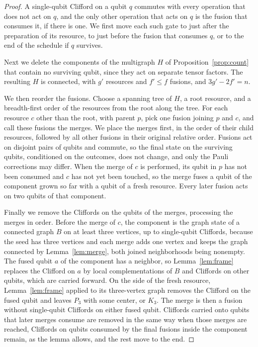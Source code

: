 \documentclass[aps,pra,onecolumn,superscriptaddress,nofootinbib,longbibliography]{revtex4-2}
\theoremstyle{plain}
\theoremstyle{remark}
\begin{document}
\begin{proof}
A single-qubit Clifford on a qubit $q$ commutes with every operation that does not act on $q$, and the only
other operation that acts on $q$ is the fusion that consumes it, if there is one. We first move each such
gate to just after the preparation of its resource, to just before the fusion that consumes $q$, or to the
end of the schedule if $q$ survives.

Next we delete the components of the multigraph $H$ of Proposition~\ref{prop:count} that contain no
surviving qubit, since they act on separate tensor factors. The resulting $H$ is connected, with $g'$
resources and $f'\le f$ fusions, and $3g'-2f'=n$.

We then reorder the fusions. Choose a spanning tree of $H$, a root resource, and a breadth-first order of
the resources from the root along the tree. For each resource $c$ other than the root, with parent $p$,
pick one fusion joining $p$ and $c$, and call these fusions the merges. We place the merges first, in the
order of their child resources, followed by all other fusions in their original relative order. Fusions act
on disjoint pairs of qubits and commute, so the final state on the surviving qubits, conditioned on the
outcomes, does not change, and only the Pauli corrections may differ. When the merge of $c$ is performed,
its qubit in $p$ has not been consumed and $c$ has not yet been touched, so the merge fuses a qubit of the
component grown so far with a qubit of a fresh resource. Every later fusion acts on two qubits of that
component.

Finally we remove the Cliffords on the qubits of the merges, processing the merges in order. Before the merge
of $c$, the component is the graph state of a connected graph $B$ on at least three vertices, up to
single-qubit Cliffords, because the seed has three vertices and each merge adds one vertex and keeps the graph
connected by Lemma~\ref{lem:merge}, both joined neighborhoods being nonempty. The fused qubit $a$ of the
component has a neighbor, so Lemma~\ref{lem:frame} replaces the Clifford on $a$ by local complementations of
$B$ and Cliffords on other qubits, which are carried forward. On the side of the fresh resource,
Lemma~\ref{lem:frame} applied to its three-vertex graph removes the Clifford on the fused qubit and leaves
$P_3$ with some center, or $K_3$. The merge is then a fusion without single-qubit Cliffords on either fused
qubit. Cliffords carried onto qubits that later merges consume are removed in the same way when those merges
are reached, Cliffords on qubits consumed by the final fusions inside the component remain, as the lemma
allows, and the rest move to the end.
\end{proof}
\end{document}
